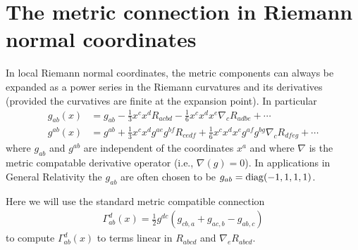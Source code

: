 \documentclass[12pt]{cdblatex}
\begin{document}
\section*{The metric connection in Riemann normal coordinates}

In local Riemann normal coordinates, the metric components can always be expanded as a power series in the Riemann curvatures and its derivatives (provided the curvatives are finite at the expansion point). In particular
\begin{align*}
   g_{ab}(x) &= g_{a b} - \frac{1}{3} x^{c} x^{d} R_{a c b d}
                        - \frac{1}{6} x^{c} x^{d} x^{e} \nabla_{c}{R_{a d b e}} + \cdots\\
   g^{ab}(x) &= g^{a b} + \frac{1}{3} x^{c} x^{d} g^{a e} g^{b f} R_{c e d f}
                        + \frac{1}{6} x^{c} x^{d} x^{e} g^{a f} g^{b g} \nabla_{c}{R_{d f e g}} + \cdots
\end{align*}
where $g_{ab}$ and $g^{ab}$ are independent of the coordinates $x^a$ and where $\nabla$ is the metric compatable derivative operator (i.e., $\nabla(g)=0$). In applications in General Relativity the $g_{ab}$ are often chosen to be $g_{ab} = {\rm diag}(-1,1,1,1)$.

Here we will use the standard metric compatible connection
\begin{align*}
   \Gamma^{d}_{ab}(x) = \frac{1}{2} g^{dc}\left( g_{cb,a} + g_{ac,b} - g_{ab,c} \right)
\end{align*}
to compute $\Gamma^{d}_{ab}(x)$ to terms linear in $R_{abcd}$ and $\nabla_{e} R_{abcd}$.

\vspace{12pt}
\end{document}
